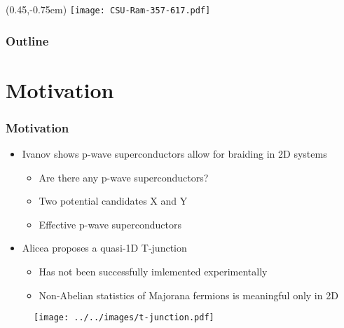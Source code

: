 \documentclass[xcolor=dvipsnames,10pt]{beamer}
\title{\TT}
\subtitle{}
\author{Aidan Winblad}
\institute{Colorado State University}
\date{\today}
\newcommand{\MO}{Motivation}
\begin{document}
  \begin{frame}
    \begin{textblock*}{100mm}(0.45\textwidth,-0.75em)
      \texttt{[image: CSU-Ram-357-617.pdf]}
    \end{textblock*}
  \titlepage
  \end{frame}

  \begin{frame}
  \frametitle{Outline}
  \tableofcontents
  \end{frame}

  \section{\MO}
  \begin{frame}
    \frametitle{\MO}

    \begin{multicols}{2}

    \begin{itemize}
      \item Ivanov shows p-wave superconductors allow for braiding in 2D systems 
        \begin{itemize}
          \item Are there any p-wave superconductors?
          \item Two potential candidates X and Y
          \item Effective p-wave superconductors
        \end{itemize}
      \item Alicea proposes a quasi-1D T-junction
        \begin{itemize}
          \item Has not been successfully imlemented experimentally
          \item Non-Abelian statistics of Majorana fermions is meaningful only in 2D
        \end{itemize}
    \end{itemize}

    \begin{figure}
      \texttt{[image: ../../images/t-junction.pdf]}
    \end{figure}
    \end{multicols}
  \end{frame}
\end{document}
